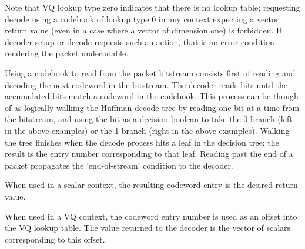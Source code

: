 Note that VQ lookup type zero indicates that there is no lookup table;
requesting decode using a codebook of lookup type 0 in any context
expecting a vector return value (even in a case where a vector of
dimension one) is forbidden.  If decoder setup or decode requests such
an action, that is an error condition rendering the packet
undecodable.

Using a codebook to read from the packet bitstream consists first of
reading and decoding the next codeword in the bitstream. The decoder
reads bits until the accumulated bits match a codeword in the
codebook.  This process can be though of as logically walking the
Huffman decode tree by reading one bit at a time from the bitstream,
and using the bit as a decision boolean to take the 0 branch (left in
the above examples) or the 1 branch (right in the above examples).
Walking the tree finishes when the decode process hits a leaf in the
decision tree; the result is the entry number corresponding to that
leaf.  Reading past the end of a packet propagates the 'end-of-stream'
condition to the decoder.

When used in a scalar context, the resulting codeword entry is the
desired return value.

When used in a VQ context, the codeword entry number is used as an
offset into the VQ lookup table.  The value returned to the decoder is
the vector of scalars corresponding to this offset.
